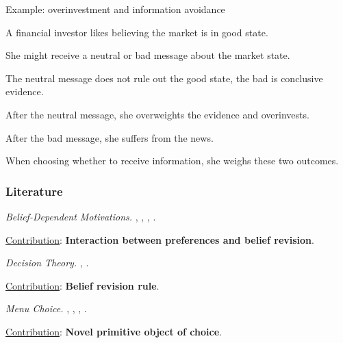 \documentclass[usenames,dvipsnames,aspectratio=169,11pt, envcountsect]{beamer}
\begin{document}
\begin{frame}{Example: overinvestment and information avoidance}

	A financial investor likes believing the market is in good state.

	\vfill

	She might receive a neutral or bad message about the market state.

	\vfill

	The neutral message does not rule out the good state, the bad is conclusive evidence.

	\vfill

	After the neutral message, she overweights the evidence and overinvests.

	\vfill

	After the bad message, she suffers from the news.

	\vfill

	When choosing whether to receive information, she weighs these two outcomes.

\end{frame}

\begin{frame}\frametitle{Literature}

	\begin{wideitemize}

		\item \textit{Belief-Dependent Motivations.} \cite{eliazCanAnticipatoryFeelings2006}, \cite{benabou2016mindful}, \cite{golmanInformationAvoidance2017}, \cite{battigalliBeliefdependentMotivationsPsychological2022}.

		\vspace{0.3cm}
		\underline{Contribution}: \textbf{Interaction between preferences and belief revision}.

		\item \textit{Decision Theory.} \cite{liangInformationdependentExpectedUtility2017}, \cite{dillenbergerAdditivebeliefbasedPreferences2020} \cite{rommeswinkelPreferenceKnowledge2023}.

		\vspace{0.3cm}
		\underline{Contribution}: \textbf{Belief revision rule}.

		\item \textit{Menu Choice.} \cite{gulTemptationSelfControl2001}, \cite{ozdenorenCompletingStateSpace2002}, \cite{epsteinAxiomaticModelNonBayesian2006}, \cite{epsteinColdFeet2007}.

		\vspace{0.3cm}
		\underline{Contribution}: \textbf{Novel primitive object of choice}.
	\end{wideitemize}

\end{frame}
\end{document}
